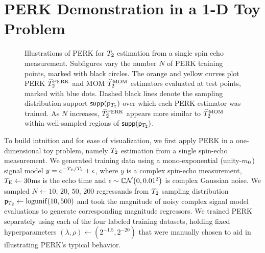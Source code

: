 \section{PERK Demonstration in a 1-D Toy Problem}
\label{s,perk,demo}

\begin{figure}[!ht]
	\centering
	\hspace{0.3cm}
	
	\hspace{0.3cm}
	\caption{%
		Illustrations of PERK 
		for $T_2$ estimation
		from a single spin echo measurement.
		Subfigures vary the number $N$
		of PERK training points,
		marked with black circles.
		The orange and yellow curves plot
		PERK $\widehat{T}_2^{\mathrm{PERK}}$ and MOM $\widehat{T}_2^{\mathrm{MOM}}$ estimators
		evaluated at test points,
		marked with blue dots.
		Dashed black lines denote 
		the sampling distribution support $\supp{\dist{\Tt}}$
		over which each PERK estimator was trained.
		As $N$ increases,
		$\widehat{T}_2^{\mathrm{PERK}}$ appears more similar to $\widehat{T}_2^{\mathrm{MOM}}$
		within well-sampled regions
		of $\supp{\dist{\Tt}}$.
	}%
	\label{fig,toy}
\end{figure}

To build intuition
and for ease of visualization,
we first apply PERK
in a one-dimensional toy problem,
namely $T_2$ estimation
from a single spin-echo measurement.
We generated training data
using a mono-exponential (unity-$m_0$) signal model
$y = e^{-T_\mathrm{E}/T_2} + \epsilon$,
where $y$ is a complex spin-echo measurement,
$T_\mathrm{E} \gets 30$ms is the echo time
and $\epsilon \sim \cgauss{0}{0.01^2}$ is complex Gaussian noise.
We sampled $N \gets 10$, $20$, $50$, $200$ regressands
from $T_2$ sampling distribution $\dist{\Tt} \gets \logunif{10,500}$
and took the magnitude 
of noisy complex signal model evaluations
to generate corresponding magnitude regressors.
We trained PERK separately
using each of the four labeled training datasets,
holding fixed hyperparameters $(\lambda,\rho) \gets (2^{-1.5},2^{-20})$
that were manually chosen
to aid in illustrating PERK's typical behavior.
	

